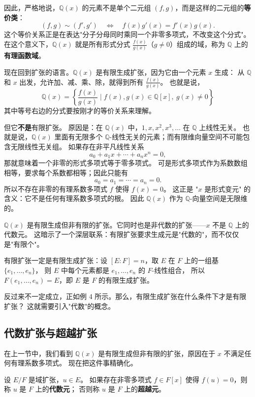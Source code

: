 因此，严格地说，$\mathbb{Q}(x)$ 的元素不是单个二元组 $(f,g)$，而是这样的二元组的\textbf{等价类}：
\[
(f,g)\sim (f',g')
\quad\Longleftrightarrow\quad
f(x)g'(x)=f'(x)g(x).
\]
这个等价关系正是在表达"分子分母同时乘同一个非零多项式，不改变这个分式"。
在这个意义下，$\mathbb{Q}(x)$ 就是所有形式分式 $\frac{f(x)}{g(x)}$（$g\neq 0$）组成的域，称为 $\mathbb{Q}$ 上的\textbf{有理函数域}。

现在回到扩张的语言。$\mathbb{Q}(x)$ 是有限生成扩张，因为它由一个元素 $x$ 生成：
从 $\mathbb{Q}$ 和 $x$ 出发，允许加、减、乘、除，就得到所有 $\frac{f(x)}{g(x)}$。
也就是说，
\[
\mathbb{Q}(x)=\left\{\frac{f(x)}{g(x)}\mid f(x),g(x)\in\mathbb{Q}[x],\ g(x)\neq 0\right\}
\]
其中等号右边的分式要按刚才的等价关系来理解。

但它\textbf{不是}有限扩张。
原因是：在 $\mathbb{Q}(x)$ 中，$1,x,x^2,x^3,\ldots$ 在 $\mathbb{Q}$ 上线性无关。
也就是说，$\mathbb{Q}(x)$ 里面有无限多个 $\mathbb{Q}$-线性无关的元素；而有限维向量空间不可能包含无限线性无关组。
如果存在非平凡线性关系
\[
a_0+a_1x+\cdots+a_nx^n=0,
\]
那就意味着一个非零的形式多项式等于零多项式。
可是形式多项式作为系数数组相等，要求每个系数都相等；因此只能有
\[
a_0=a_1=\cdots=a_n=0.
\]
所以不存在非零的有理系数多项式 $f$ 使得 $f(x)=0$。
这正是 "$x$ 是形式变元" 的含义：它不是任何有理系数多项式的根。
因此 $\mathbb{Q}(x)$ 作为 $\mathbb{Q}$-向量空间是无限维的。

$\mathbb{Q}(x)$ 是有限生成但非有限的扩张。它同时也是非代数的扩张——$x$ 不是 $\mathbb{Q}$ 上的代数元。
这暗示了一个深层联系：有限扩张要求生成元是"代数的"，而不仅仅是"有限个"。

有限扩张一定是有限生成扩张：设 $[E:F] = n$，取 $E$ 在 $F$ 上的一组基 $\{e_1, \ldots, e_n\}$，
则 $E$ 中每个元素都是 $e_1, \ldots, e_n$ 的 $F$-线性组合，
所以 $F(e_1, \ldots, e_n) = E$，即 $E$ 是 $F$ 的有限生成扩张。

反过来不一定成立，正如例 4 所示。那么，有限生成扩张在什么条件下才是有限扩张？
这就需要引入"代数"的概念。

\subsection{代数扩张与超越扩张}

在上一节中，我们看到 $\mathbb{Q}(x)$ 是有限生成但非有限的扩张，原因在于 $x$ 不满足任何有理系数多项式。
现在把这件事精确化。

\begin{definition}[代数元与超越元]\label{def:algebraic-transcendental}
设 $E/F$ 是域扩张，$u \in E$。
如果存在非零多项式 $f \in F[x]$ 使得 $f(u) = 0$，则称 $u$ 是 $F$ 上的\textbf{代数元}；
否则称 $u$ 是 $F$ 上的\textbf{超越元}。
\end{definition}

